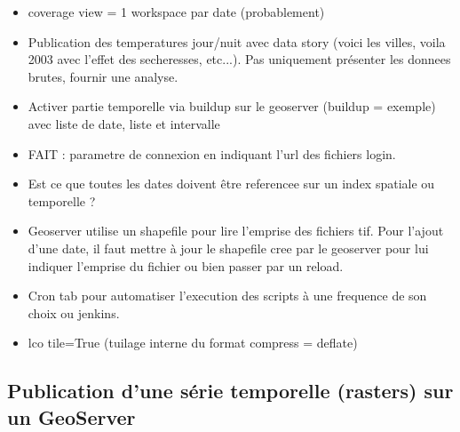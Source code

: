 \documentclass[10pt,a4paper]{article}
\begin{document}
\begin{itemize}
\item coverage view = 1 workspace par date (probablement)
\item Publication des temperatures jour/nuit avec data story (voici les villes, voila 2003 avec l'effet des secheresses, etc...). Pas uniquement présenter les donnees brutes, fournir une analyse.
\item Activer partie temporelle via buildup sur le geoserver (buildup = exemple) avec liste de date, liste et intervalle
\item FAIT : parametre de connexion en indiquant l'url des fichiers login.
\item Est ce que toutes les dates doivent être referencee sur un index spatiale ou temporelle ?
\item Geoserver utilise un shapefile pour lire l'emprise des fichiers tif. Pour l'ajout d'une date, il faut mettre à jour le shapefile cree par le geoserver pour lui indiquer l'emprise du fichier ou bien passer par un reload.
\item Cron tab pour automatiser l'execution des scripts à une frequence de son choix ou jenkins.
\item             lco tile=True (tuilage interne du format
            compress = deflate)
\end{itemize}

\subsection{Publication d'une série temporelle (rasters) sur un GeoServer}
\end{document}
